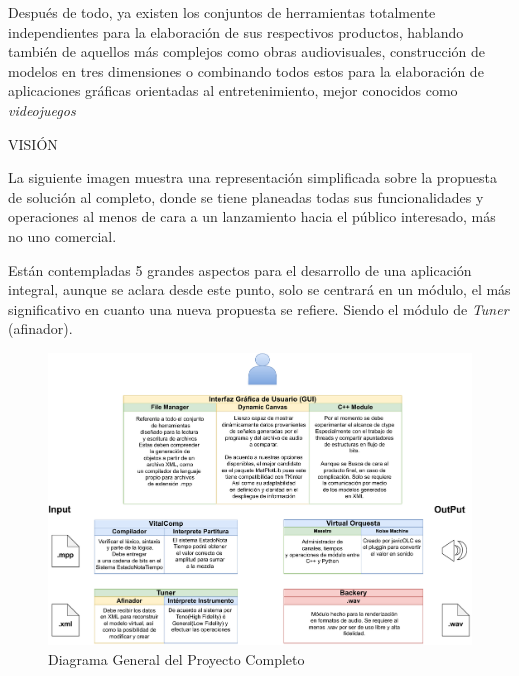 \documentclass{book}
\begin{document}
	Después de todo, ya existen los conjuntos de herramientas totalmente independientes para la elaboración de sus respectivos productos, hablando también de aquellos más complejos como obras audiovisuales, construcción de modelos en tres dimensiones o combinando todos estos para la elaboración de aplicaciones gráficas orientadas al entretenimiento, mejor conocidos como \emph{videojuegos}\par
	
	\pagebreak
	\begin{minipage}{.7\textwidth}
		\begin{flushleft}
			\vspace{10pt}
			\begin{center}
				\Large{VISIÓN}
				\hrulefill\\[1.5cm]
			\end{center}
		\end{flushleft}
	\end{minipage}\par
	La siguiente imagen muestra una representación simplificada sobre la propuesta de solución al completo, donde se tiene planeadas todas sus funcionalidades y operaciones al menos de cara a un lanzamiento hacia el público interesado, más no uno comercial.\par
	
	Están contempladas 5 grandes aspectos para el desarrollo de una aplicación integral, aunque se aclara desde este punto, solo se centrará en un módulo, el más significativo en cuanto una nueva propuesta se refiere. Siendo el módulo de \emph{Tuner} (afinador).
	\begin{figure}[h]
		\includegraphics[width=1.25\linewidth]{Assets/images/musiC++_Diagram}
		\caption{ Diagrama General del Proyecto Completo}
	\end{figure} 
	
\end{document}
